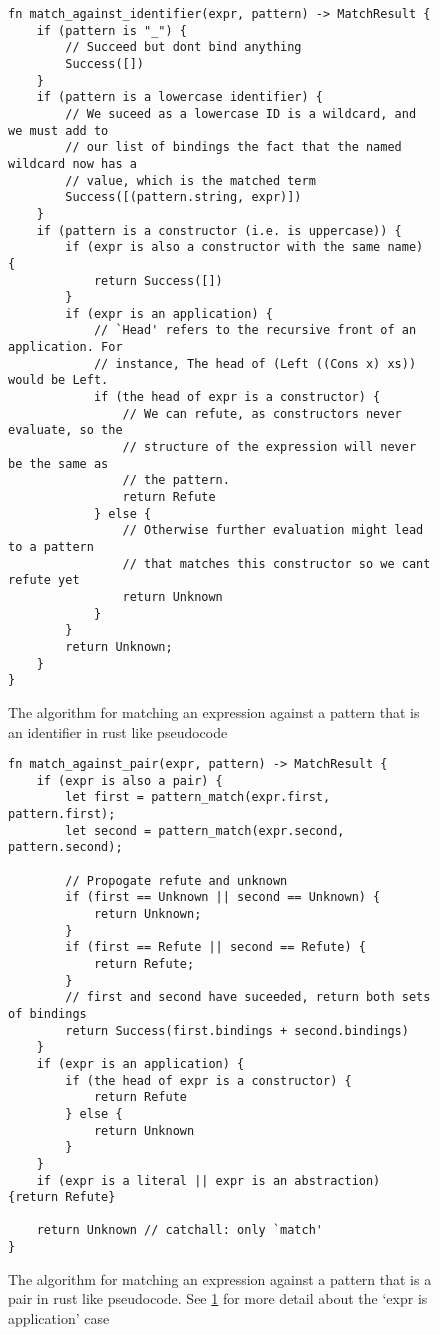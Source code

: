 \begin{figure}[h]
    \begin{lstlisting}[language=Rust_boxed]
fn match_against_identifier(expr, pattern) -> MatchResult {
    if (pattern is "_") {
        // Succeed but dont bind anything
        Success([])
    }
    if (pattern is a lowercase identifier) {
        // We suceed as a lowercase ID is a wildcard, and we must add to 
        // our list of bindings the fact that the named wildcard now has a 
        // value, which is the matched term 
        Success([(pattern.string, expr)])
    }
    if (pattern is a constructor (i.e. is uppercase)) {
        if (expr is also a constructor with the same name) {
            return Success([])
        }
        if (expr is an application) {
            // `Head' refers to the recursive front of an application. For 
            // instance, The head of (Left ((Cons x) xs)) would be Left.
            if (the head of expr is a constructor) {
                // We can refute, as constructors never evaluate, so the 
                // structure of the expression will never be the same as
                // the pattern. 
                return Refute
            } else {
                // Otherwise further evaluation might lead to a pattern 
                // that matches this constructor so we cant refute yet
                return Unknown
            }
        }
        return Unknown;
    }
}
    \end{lstlisting}
    \caption{The algorithm for matching an expression against a pattern that is an identifier in rust like pseudocode}
    \label{fig:pattern_list_id}
\end{figure}

\begin{figure}[h]
    \begin{lstlisting}[language=Rust_boxed]
fn match_against_pair(expr, pattern) -> MatchResult {
    if (expr is also a pair) {
        let first = pattern_match(expr.first, pattern.first);
        let second = pattern_match(expr.second, pattern.second);

        // Propogate refute and unknown
        if (first == Unknown || second == Unknown) {
            return Unknown;
        }
        if (first == Refute || second == Refute) {
            return Refute;
        }
        // first and second have suceeded, return both sets of bindings
        return Success(first.bindings + second.bindings)
    }
    if (expr is an application) {
        if (the head of expr is a constructor) {
            return Refute
        } else {
            return Unknown
        }
    }
    if (expr is a literal || expr is an abstraction) {return Refute}    
    
    return Unknown // catchall: only `match'
}
\end{lstlisting}
    \caption{The algorithm for matching an expression against a pattern that is a pair in rust like pseudocode. See \ref{fig:pattern_list_id} for more detail about the `expr is application' case}
    \label{fig:pattern_list_pair}
\end{figure}

